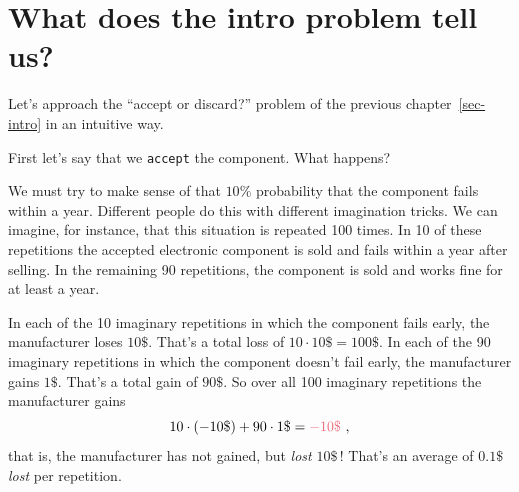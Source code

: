 \documentclass[
  a4paper,
  DIV=11,
  numbers=noendperiod,
  oneside]{scrreprt}
\begin{document}
\providecommand{\ul}{\uline}
\renewcommand*{\|}[1][]{\nonscript\:#1\vert\nonscript\:\mathopen{}}
\providecommand*{\pr}[1]{\textsf{\small`#1'}}
\renewcommand*{\pr}[1]{\textsf{\small`#1'}}
\providecommand*{\prq}[1]{\textsf{\small #1}}
\renewcommand*{\prq}[1]{\textsf{\small #1}}
\providecommand{\se}[1]{\mathsfit{#1}}
\renewcommand{\se}[1]{\mathsfit{#1}}
\providecommand{\p}{\mathrm{p}}
\renewcommand{\p}{\mathrm{p}}
\renewcommand{\P}{\mathrm{P}}

\hypertarget{what-does-the-intro-problem-tell-us}{%
\section{What does the intro problem tell
us?}\label{what-does-the-intro-problem-tell-us}}

Let's approach the ``accept or discard?'' problem of the previous
chapter~\ref{sec-intro} in an intuitive way.


First let's say that we \texttt{accept} the component. What happens?

We must try to make sense of that \(10\%\) probability that the
component fails within a year. Different people do this with different
imagination tricks. We can imagine, for instance, that this situation is
repeated 100 times. In 10 of these repetitions the accepted electronic
component is sold and fails within a year after selling. In the
remaining 90 repetitions, the component is sold and works fine for at
least a year.

In each of the 10 imaginary repetitions in which the component fails
early, the manufacturer loses \(10\$\). That's a total loss of
\(10 \cdot 10\$ = 100\$\). In each of the 90 imaginary repetitions in
which the component doesn't fail early, the manufacturer gains \(1\$\).
That's a total gain of \(90\$\). So over all 100 imaginary repetitions
the manufacturer gains \[
10\cdot (-10\$) + 90\cdot 1\$ = {\color[RGB]{238,102,119} -10\$} \ ,
\] that is, the manufacturer has not gained, but \emph{lost} \(10\$\)\,!
That's an average of \(0.1\$\) \emph{lost} per repetition.
\end{document}
